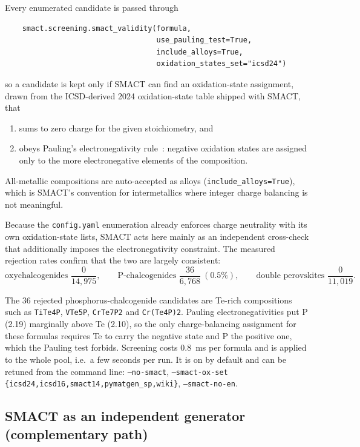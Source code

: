 \documentclass[11pt,a4paper]{article}
\newcommand{\code}[1]{\texttt{#1}}
\newcommand{\cmd}[1]{\texttt{\small #1}}
\begin{document}
Every enumerated candidate is passed through
\begin{verbatim}
    smact.screening.smact_validity(formula,
                                   use_pauling_test=True,
                                   include_alloys=True,
                                   oxidation_states_set="icsd24")
\end{verbatim}
so a candidate is kept only if SMACT can find an oxidation-state assignment, drawn from the
ICSD-derived 2024 oxidation-state table shipped with SMACT, that
\begin{enumerate}[label=(\alph*)]
  \item sums to zero charge for the given stoichiometry, and
  \item obeys Pauling's electronegativity rule~\cite{pauling}: negative oxidation states are
        assigned only to the more electronegative elements of the composition.
\end{enumerate}
All-metallic compositions are auto-accepted as alloys (\code{include\_alloys=True}), which is
SMACT's convention for intermetallics where integer charge balancing is not meaningful.

Because the \code{config.yaml} enumeration already enforces charge neutrality with its own
oxidation-state lists, SMACT acts here mainly as an independent cross-check that additionally
imposes the electronegativity constraint. The measured rejection rates confirm that the two are
largely consistent:
\[
  \text{oxychalcogenides } \frac{0}{14{,}975}, \qquad
  \text{P-chalcogenides } \frac{36}{6{,}768}\ (0.5\%), \qquad
  \text{double perovskites } \frac{0}{11{,}019}.
\]

The 36 rejected phosphorus-chalcogenide candidates are Te-rich compositions such as
\code{TiTe4P}, \code{VTe5P}, \code{CrTe7P2} and \code{Cr(Te4P)2}. Pauling electronegativities put
P (2.19) marginally above Te (2.10), so the only charge-balancing assignment for these formulas
requires Te to carry the negative state and P the positive one, which the Pauling test forbids.
Screening costs \SI{0.8}{ms} per formula and is applied to the whole pool, i.e.\ a few seconds
per run. It is on by default and can be retuned from the command line: \cmd{--no-smact},
\cmd{--smact-ox-set \{icsd24,icsd16,smact14,pymatgen\_sp,wiki\}}, \cmd{--smact-no-en}.

\subsection*{SMACT as an independent generator (complementary path)}
\end{document}

